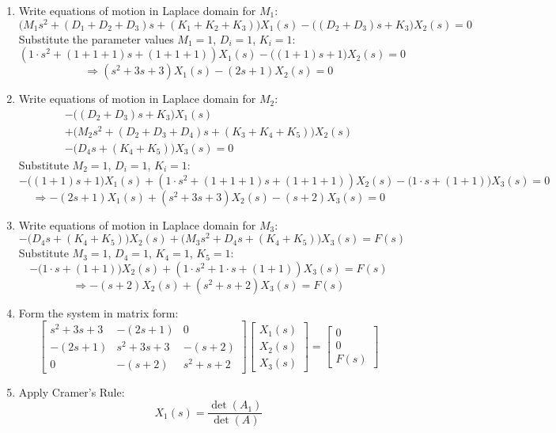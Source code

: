 \documentclass[11pt]{article}
\begin{document}
\begin{enumerate}[label=(\alph*), itemindent=*, leftmargin=*, nolistsep]

    \item Write equations of motion in Laplace domain for $M_1$:
\[
\big(M_1 s^2 + (D_1+D_2+D_3)s + (K_1+K_2+K_3)\big)X_1(s)
- \big((D_2+D_3)s + K_3\big)X_2(s) = 0
\]
Substitute the parameter values $M_1=1$, $D_i=1$, $K_i=1$:
\[
(1\cdot s^2 + (1+1+1)s + (1+1+1))X_1(s)
- \big((1+1)s + 1\big)X_2(s) = 0
\]
\[
\Rightarrow (s^2 + 3s + 3)X_1(s) - (2s+1)X_2(s) = 0
\]

\item Write equations of motion in Laplace domain for $M_2$:
\begin{multline}
-\big((D_2+D_3)s + K_3\big)X_1(s) \\
+\big(M_2 s^2 + (D_2+D_3+D_4)s + (K_3+K_4+K_5)\big)X_2(s) \\
-\big(D_4 s + (K_4+K_5)\big)X_3(s) = 0
\end{multline}
Substitute $M_2=1$, $D_i=1$, $K_i=1$:
\[
-\big((1+1)s + 1\big)X_1(s)
+(1\cdot s^2 + (1+1+1)s + (1+1+1))X_2(s)
-\big(1\cdot s + (1+1)\big)X_3(s) = 0
\]
\[
\Rightarrow -(2s+1)X_1(s) + (s^2+3s+3)X_2(s) - (s+2)X_3(s) = 0
\]

\item Write equations of motion in Laplace domain for $M_3$:
\[
-\big(D_4 s + (K_4+K_5)\big)X_2(s)
+ \big(M_3 s^2 + D_4 s + (K_4+K_5)\big)X_3(s) = F(s)
\]
Substitute $M_3=1$, $D_4=1$, $K_4=1$, $K_5=1$:
\[
-\big(1\cdot s + (1+1)\big)X_2(s) + (1\cdot s^2 + 1\cdot s + (1+1))X_3(s) = F(s)
\]
\[
\Rightarrow -(s+2)X_2(s) + (s^2+s+2)X_3(s) = F(s)
\]

\item Form the system in matrix form:
\[
\begin{bmatrix}
s^2 + 3s + 3 & -(2s+1) & 0 \\
-(2s+1) & s^2 + 3s + 3 & -(s+2) \\
0 & -(s+2) & s^2+s+2
\end{bmatrix}
\begin{bmatrix}
X_1(s) \\ X_2(s) \\ X_3(s)
\end{bmatrix}
=
\begin{bmatrix}
0 \\ 0 \\ F(s)
\end{bmatrix}
\]

\item Apply Cramer's Rule:
\[
X_1(s) = \frac{\det(A_1)}{\det(A)}
\]


\end{enumerate}
\end{document}
